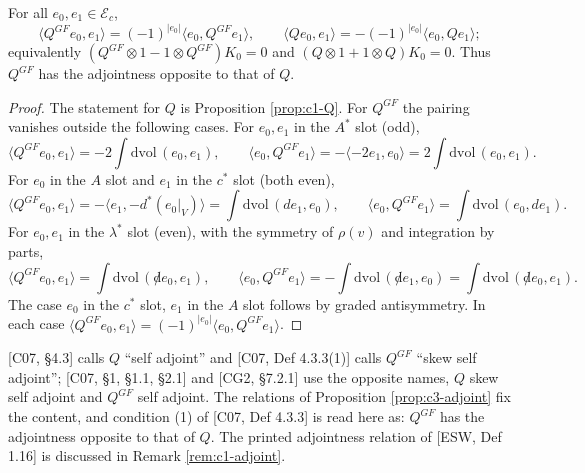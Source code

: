 \begin{proposition}[Adjointness]
\label{prop:c3-adjoint}
For all $e_0,e_1\in\mathscr E_c$,
\[
\langle Q^{GF}e_0,e_1\rangle=(-1)^{|e_0|}\langle e_0,Q^{GF}e_1\rangle,\qquad \langle Qe_0,e_1\rangle=-(-1)^{|e_0|}\langle e_0,Qe_1\rangle ;
\]
equivalently $(Q^{GF}\otimes1-1\otimes Q^{GF})K_0=0$ and $(Q\otimes1+1\otimes Q)K_0=0$. Thus $Q^{GF}$ has the adjointness opposite to that of $Q$.
\end{proposition}

\begin{proof}
The statement for $Q$ is Proposition \ref{prop:c1-Q}. For $Q^{GF}$ the pairing vanishes outside the following cases. For $e_0,e_1$ in the $A^*$ slot (odd),
\[
\langle Q^{GF}e_0,e_1\rangle=-2\int\mathrm{dvol}\,(e_0,e_1),\qquad \langle e_0,Q^{GF}e_1\rangle=-\langle-2e_1,e_0\rangle=2\int\mathrm{dvol}\,(e_0,e_1).
\]
For $e_0$ in the $A$ slot and $e_1$ in the $c^*$ slot (both even),
\[
\langle Q^{GF}e_0,e_1\rangle=-\langle e_1,-d^*(e_0|_V)\rangle=\int\mathrm{dvol}\,(de_1,e_0),\qquad \langle e_0,Q^{GF}e_1\rangle=\int\mathrm{dvol}\,(e_0,de_1).
\]
For $e_0,e_1$ in the $\lambda^*$ slot (even), with the symmetry of $\rho(v)$ and integration by parts,
\[
\langle Q^{GF}e_0,e_1\rangle=\int\mathrm{dvol}\,({\not d}e_0,e_1),\qquad \langle e_0,Q^{GF}e_1\rangle=-\int\mathrm{dvol}\,({\not d}e_1,e_0)=\int\mathrm{dvol}\,({\not d}e_0,e_1).
\]
The case $e_0$ in the $c^*$ slot, $e_1$ in the $A$ slot follows by graded antisymmetry. In each case $\langle Q^{GF}e_0,e_1\rangle=(-1)^{|e_0|}\langle e_0,Q^{GF}e_1\rangle$.
\end{proof}

\begin{remark}
\label{rem:c3-names}
[C07, §4.3] calls $Q$ ``self adjoint'' and [C07, Def 4.3.3(1)] calls $Q^{GF}$ ``skew self adjoint''; [C07, §1, §1.1, §2.1] and [CG2, §7.2.1] use the opposite names, $Q$ skew self adjoint and $Q^{GF}$ self adjoint. The relations of Proposition \ref{prop:c3-adjoint} fix the content, and condition (1) of [C07, Def 4.3.3] is read here as: $Q^{GF}$ has the adjointness opposite to that of $Q$. The printed adjointness relation of [ESW, Def 1.16] is discussed in Remark \ref{rem:c1-adjoint}.
\end{remark}


